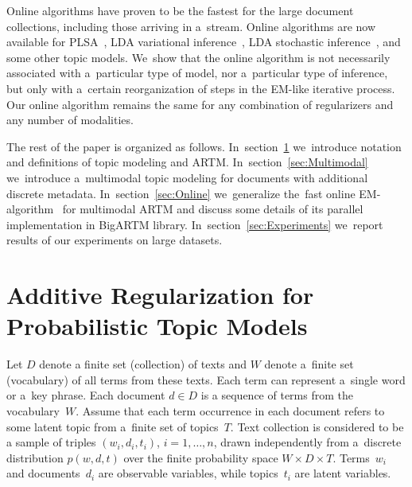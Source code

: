 \documentclass{acm_proc_article-sp}
\begin{document}
Online algorithms have proven to be the fastest
for the large document collections, including those arriving in a~stream.
Online algorithms are now available for
PLSA~\cite{bassiou14online},
LDA variational inference~\cite{hoffman10online},
LDA stochastic inference~\cite{mimno12sparse}, and
some other topic models.
We~show that the online algorithm is not necessarily associated with
a~particular type of model, nor
a~particular type of inference,
but only with a~certain reorganization of steps in the EM-like iterative process.
Our online algorithm remains the same
for any combination of regularizers and any number of modalities.

The rest of the paper is organized as follows.
%
In~section~\ref{sec:ARTM}
we~introduce notation and definitions of topic modeling and ARTM.
%
In~section~\ref{sec:Multimodal}
we~introduce a~multimodal topic modeling for documents with additional discrete metadata.
%
In~section~\ref{sec:Online}
we~generalize the~fast online EM-algorithm~\cite{hoffman10online} for multimodal ARTM
%
and discuss some details of its parallel implementation in BigARTM library.
%
In~section~\ref{sec:Experiments}
we~report results of our experiments on large datasets.
%

\section{Additive Regularization for\\ Probabilistic Topic Models}
\label{sec:ARTM}


Let
$D$ denote a finite set (collection) of texts and
$W$ denote a~finite set (vocabulary) of all terms from these texts.
Each term can represent a~single word or a~key phrase.
Each document ${d\in D}$ is a sequence of terms from the vocabulary~$W$.
Assume that
each term occurrence in each document refers to some latent topic from a~finite set of topics~$T$.
Text collection is considered to be a sample of triples
$(w_i,d_i,t_i)$,\; ${i=1,\dots,n}$,
drawn independently from a~discrete distribution $p(w,d,t)$
over the finite probability space $W\times D \times T$.
Terms~$w_i$ and documents~$d_i$ are observable variables,
while topics~$t_i$ are latent variables.
\end{document}
